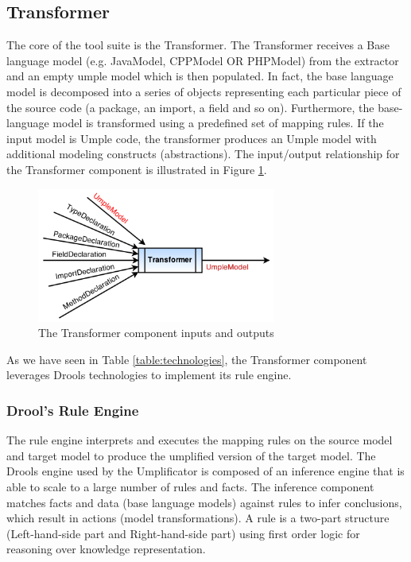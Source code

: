 \subsection{Transformer}

The core of the tool suite is the Transformer. The Transformer receives a Base language model (e.g. JavaModel, CPPModel OR PHPModel) from the extractor and an empty umple model which is then populated. In fact, the base language model is decomposed into a series of objects representing each particular piece of the source code (a package, an import, a field and so on). Furthermore, the base-language model is transformed using a predefined set of mapping rules. If the input model is Umple code, the transformer produces an Umple model with additional modeling constructs (abstractions). The input/output relationship for the Transformer component is illustrated in Figure 
\ref{fig:transformerInOut}.

\begin{figure}[h]
\centering
\includegraphics[width=0.70\textwidth]{Figures/transformerINOut.png}
\caption{The Transformer component inputs and outputs}
\label{fig:transformerInOut}
\end{figure}

As we have seen in Table \ref{table:technologies}, the Transformer component leverages Drools technologies to implement its rule engine.

\subsubsection{Drool's Rule Engine}

The rule engine interprets and executes the mapping rules on the source model and target model to produce the umplified version of the target model.
The Drools engine used by the Umplificator is composed of an inference engine that is able to scale to a large number of rules and facts.  The inference component matches facts and data (base language models) against rules to infer conclusions, which result in actions (model transformations). A rule is a two-part structure (Left-hand-side part and Right-hand-side part) using first order logic for reasoning over knowledge representation.

